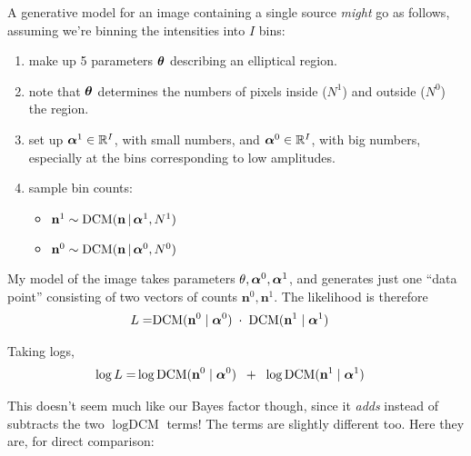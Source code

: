 \documentclass[12pt]{article}
\newcommand{\given}{\,|\,}
\renewcommand{\vec}[1]{\mathbf{#1}}
\newcommand{\balpha}{\mbox{\boldmath $\alpha$}}
\newcommand{\btheta}{\mbox{\boldmath $\theta$}}
\newcommand{\DCM}{\mbox{DCM}}
\begin{document}
A generative model for an image containing a single source \emph{might}
go as follows, assuming we're binning the intensities into $I$ bins:
\begin{enumerate}
\item make up 5 parameters $\btheta$ describing an elliptical region. 
\item note that $\btheta$ determines the numbers of pixels inside ($N^1$)  and  outside ($N^0$) the region.
\item set up $\balpha^1 \in \mathbb{R}^I$, with small numbers,
  and $\balpha^0 \in \mathbb{R}^I$, with big numbers, especially at the bins corresponding to low amplitudes.
\item sample bin counts:
  \begin{itemize}
    \item    $\vec{n}^1 \sim \DCM(\vec{n} \given \balpha^1, N^1)$
    \item $\vec{n}^0 \sim \DCM(\vec{n} \given \balpha^0, N^0)$
  \end{itemize}
\end{enumerate}

My model of the image takes parameters $\theta, \balpha^0, \balpha^1$,
and generates just one ``data point'' consisting of two vectors of
counts $\vec{n}^0,\vec{n}^1$.  The likelihood is therefore
\begin{align}
L =& \DCM(\vec{n}^0 \mid \balpha^0) \; \cdot \; \DCM(\vec{n}^1 \mid \balpha^1) 
\end{align}

Taking logs,
\begin{align*}
\log L =& \log \DCM(\vec{n}^0 \mid \balpha^0) \;\; + \;\; \log \DCM(\vec{n}^1 \mid \balpha^1) 
\end{align*}

This doesn't seem much like our Bayes factor though, since it
\emph{adds} instead of subtracts the two $\log \DCM$ terms! The terms
are slightly different too.  Here they are, for direct comparison:
\end{document}
